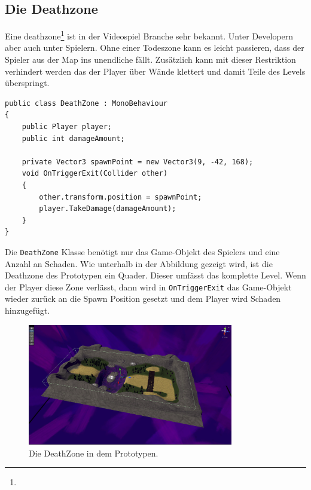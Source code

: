 \pagebreak

\subsection{Die Deathzone}
Eine \gls{deathzone}\footnote[1]{} ist in der Videospiel Branche sehr bekannt. Unter Developern aber auch unter Spielern. Ohne einer Todeszone kann es leicht passieren, dass der Spieler aus der Map ins unendliche fällt. Zusätzlich kann mit dieser Restriktion verhindert werden das der Player über Wände klettert und damit Teile des Levels überspringt.\\

\begin{lstlisting}[language=CSharp,caption={DeathZone},label=code:deathzone]
public class DeathZone : MonoBehaviour
{
    public Player player;
    public int damageAmount;

    private Vector3 spawnPoint = new Vector3(9, -42, 168);
    void OnTriggerExit(Collider other)
    {
        other.transform.position = spawnPoint;
        player.TakeDamage(damageAmount);
    }
}
\end{lstlisting}

Die \verb+DeathZone+ Klasse benötigt nur das Game-Objekt des Spielers und eine Anzahl an Schaden. Wie unterhalb in der Abbildung gezeigt wird, ist die Deathzone des Prototypen ein Quader. Dieser umfässt das komplette Level. Wenn der Player diese Zone verlässt, dann wird in \verb+OnTriggerExit+ das Game-Objekt wieder zurück an die Spawn Position gesetzt und dem Player wird Schaden hinzugefügt.

\begin{figure}[H]
    \centering
    \includegraphics[width=0.8\textwidth]{chapters/05/images/DeathZone.png}
    \caption{Die DeathZone in dem Prototypen.}
    \label{SD02}
\end{figure}
\pagebreak


